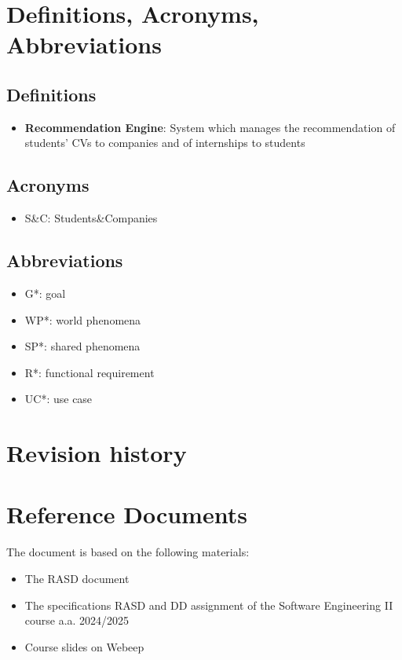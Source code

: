 \section{Definitions, Acronyms, Abbreviations}
\subsection{Definitions }
\begin{itemize}
    \item \textbf{Recommendation Engine}: System which manages the recommendation of students' CVs to companies and of internships to students
\end{itemize}

\subsection{Acronyms }
\begin{itemize}
    \item S\&C: Students\&Companies
\end{itemize}

\subsection{Abbreviations }
\begin{itemize}
    \item G*: goal
    \item WP*: world phenomena
    \item SP*: shared phenomena
    \item R*: functional requirement
    \item UC*: use case
\end{itemize}

\section{Revision history}


\section{Reference Documents}
The document is based on the following materials:
\begin{itemize}
    \item The RASD document
    \item The specifications RASD and DD assignment of the Software Engineering II course a.a. 2024/2025
    \item Course slides on Webeep
\end{itemize}


